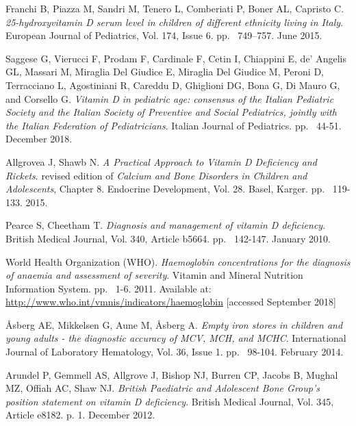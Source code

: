 \begin{thebibliography}{50}
  Franchi B, Piazza M, Sandri M, Tenero L, Comberiati P, Boner AL, Capristo C.
  \textit{25-hydroxyvitamin D serum level in children of different ethnicity living in Italy}.
  European Journal of Pediatrics, Vol. 174, Issue 6.
  pp. ~749–757.
  June 2015.
  
  Saggese G, Vierucci F, Prodam F, Cardinale F, Cetin I, Chiappini E, de’ Angelis GL, Massari M, Miraglia Del Giudice E, Miraglia Del Giudice M, Peroni D, Terracciano L, Agostiniani R, Careddu D, Ghiglioni DG, Bona G, Di Mauro G, and Corsello G.
  \textit{Vitamin D in pediatric age: consensus of the Italian Pediatric Society and the Italian Society of Preventive and Social Pediatrics, jointly with the Italian Federation of Pediatricians}.
  Italian Journal of Pediatrics.
  pp. ~44-51.
  December 2018.
  
  Allgrovea J, Shawb N.
  \textit{A Practical Approach to Vitamin D Deficiency and Rickets}.
   revised edition of \textit{Calcium and Bone Disorders in Children and Adolescents}, Chapter 8.
  Endocrine Development, Vol. 28.
  Basel, Karger.
  pp. ~119-133.
  2015.
  
  Pearce S, Cheetham T.
  \textit{Diagnosis and management of vitamin D deficiency}.
  British Medical Journal, Vol. 340, Article b5664.
  pp. ~142-147.
  January 2010.
  
  World Health Organization (WHO).
  \textit{Haemoglobin concentrations for the diagnosis of anaemia and assessment of severity}.
  Vitamin and Mineral Nutrition Information System.
  pp. ~1-6.
  2011.
  Available at: \url{http://www.who.int/vmnis/indicators/haemoglobin} [accessed September 2018]
  
  Åsberg AE, Mikkelsen G, Aune M, Åsberg A.
  \textit{Empty iron stores in children and young adults - the diagnostic accuracy of MCV, MCH, and MCHC}.
  International Journal of Laboratory Hematology, Vol. 36, Issue 1.
  pp. ~98-104.
  February 2014.
  
  Arundel P, Gemmell AS, Allgrove J, Bishop NJ, Burren CP, Jacobs B, Mughal MZ, Offiah AC, Shaw NJ.
  \textit{British Paediatric and Adolescent Bone Group’s position statement on vitamin D deficiency}.
  British Medical Journal, Vol. 345, Article e8182.
  p. 1.
  December 2012.
  

\end{thebibliography}
